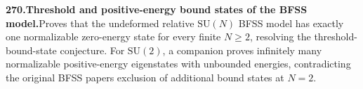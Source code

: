 \documentclass[11pt,a4paper]{article}
\begin{document}
  \par \begin{minipage}{\linewidth}
  \fontsize{10.5}{12.6}\selectfont\RaggedRight
  \hypertarget{result 270}{}
  {\bfseries\textcolor{muted}{270.}\enspace Threshold and positive-energy bound states of the BFSS model.}\enspace Proves that the undeformed relative $\mathrm{SU}(N)$ BFSS model has exactly one normalizable zero-energy state for every finite $N\ge2$, resolving the threshold-bound-state conjecture. For $\mathrm{SU}(2)$, a companion proves infinitely many normalizable positive-energy eigenstates with unbounded energies, contradicting the original BFSS paper\textquotesingle s exclusion of additional bound states at $N=2$.\par
  \end{minipage}\par\vspace{5pt}
\end{document}
